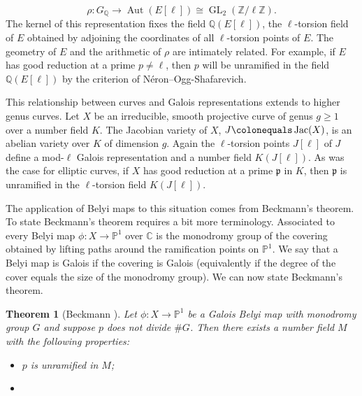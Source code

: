 \documentclass{dcthesis}
\newcommand{\PP}{\mathbb P}
\newcommand{\CC}{\mathbb C}
\newcommand{\QQ}{\mathbb Q}
\newcommand{\ZZ}{\mathbb Z}
\newcommand{\defi}[1]{\textsf{#1}}
\DeclareMathOperator{\Aut}{Aut}
\DeclareMathOperator{\GL}{GL}
\DeclareMathOperator{\Jac}{Jac}
\numberwithin{equation}{section}
\newtheorem{theorem}[equation]{Theorem}
\theoremstyle{definition}
\theoremstyle{remark}
\begin{document}
{{{    \begin{equation}
      \label{eqn:modlgalois}
      \rho\colon
      G_\QQ\to
      \Aut(E[\ell])\cong
      \GL_2(\ZZ/\ell\ZZ).
    \end{equation}
    The kernel of this
    representation fixes the field
    $\QQ(E[\ell])$,
    the
    $\ell$-torsion field of $E$
    obtained by adjoining the coordinates
    of all $\ell$-torsion points of $E$.
    The geometry of $E$ and the arithmetic
    of $\rho$ are intimately related.
    For example,
    if $E$ has good reduction at a prime $p\neq\ell$,
    then $p$ will be unramified in
    the field $\QQ(E[\ell])$
    by the criterion of
    N\'{e}ron--Ogg-Shafarevich.
    \par
    This relationship between curves and Galois
    representations extends to higher genus
    curves.
    Let $X$ be an
    irreducible, smooth projective
    curve
    of genus $g\geq 1$
    over a number field $K$.
    The Jacobian variety of $X$,
    $J\colonequals \Jac(X)$,
    is an abelian variety over $K$
    of dimension $g$.
    Again the $\ell$-torsion points
    $J[\ell]$ of $J$
    define a mod-$\ell$ Galois representation
    and a number field $K(J[\ell])$.
    As was the case for elliptic curves,
    if $X$ has good reduction at a prime
    $\mathfrak{p}$ in $K$,
    then $\mathfrak{p}$ is unramified in
    the $\ell$-torsion field
    $K(J[\ell])$.
    \par
    The application of Belyi maps to this
    situation comes from Beckmann's theorem.
    To state Beckmann's theorem requires
    a bit more terminology.
    Associated to every Belyi map
    $\phi\colon X\to\PP^1$
    over $\CC$
    is the \defi{monodromy group}
    of the covering
    obtained by lifting paths around
    the ramification points on $\PP^1$.
    We say that a Belyi map is
    \defi{Galois} if the covering is Galois
    (equivalently if the degree
    of the cover equals the size
    of the monodromy group).
    We can now state Beckmann's theorem.
    \begin{theorem}[Beckmann \cite{beckmann}]
      \label{thm:beckmann}
      Let $\phi\colon X\to\PP^1$
      be a Galois Belyi map with
      monodromy group $G$
      and suppose $p$ does not divide $\# G$.
      Then there exists a number field $M$
      with the following properties:
      \begin{itemize}
        \item
          $p$ is unramified in $M$;
        \item

\end{itemize}
\end{theorem}}}}
\end{document}
